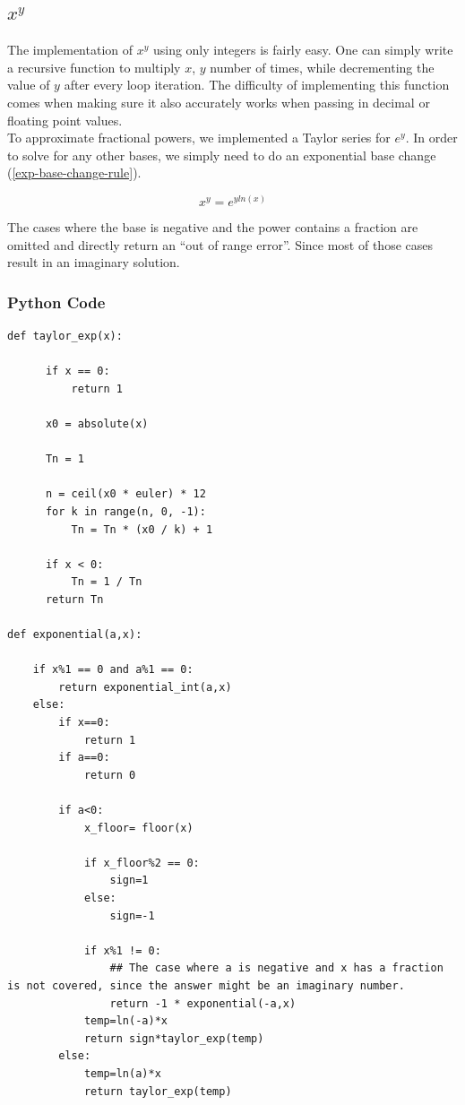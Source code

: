 \documentclass[11pt,onside]{report}
\begin{document}
\subsection{$x^y$} \label{exp-implementation}
The implementation of $x^y$ using only integers is fairly easy. One can simply write a recursive function to multiply $x$, $y$ number of times, while decrementing the value of $y$ after every loop iteration. The difficulty of implementing this function comes when making sure it also accurately works when passing in decimal or floating point values. \\

To approximate fractional powers, we implemented a Taylor series for $e^y$. In order to solve for any other bases, we simply need to do an exponential base change (\ref{exp-base-change-rule}).   

\begin{equation} \label{exp-base-change-rule}
    x^y = e^{y ln(x)} 
\end{equation}

The cases where the base is negative and the power contains a fraction are omitted and directly return an “out of range error”. Since most of those cases result in an  imaginary solution. \cite{implementing-exp}

\subsubsection{Python Code}
\begin{lstlisting}
def taylor_exp(x):    
     
      if x == 0:
          return 1
      
      x0 = absolute(x)
     
      Tn = 1
      
      n = ceil(x0 * euler) * 12
      for k in range(n, 0, -1):
          Tn = Tn * (x0 / k) + 1
     
      if x < 0:
          Tn = 1 / Tn
      return Tn
      
def exponential(a,x):

    if x%1 == 0 and a%1 == 0:
        return exponential_int(a,x)
    else:
        if x==0:
            return 1
        if a==0:
            return 0

        if a<0:
            x_floor= floor(x)

            if x_floor%2 == 0:
                sign=1
            else:
                sign=-1

            if x%1 != 0:
                ## The case where a is negative and x has a fraction is not covered, since the answer might be an imaginary number.
                return -1 * exponential(-a,x)
            temp=ln(-a)*x
            return sign*taylor_exp(temp)
        else:
            temp=ln(a)*x
            return taylor_exp(temp)
\end{lstlisting}
\end{document}
